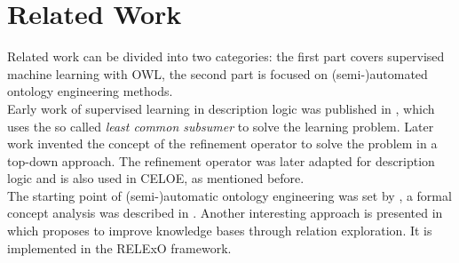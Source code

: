\section{Related Work}
Related work can be divided into two categories: the first part covers
supervised machine learning with OWL, the second part is focused on
(semi-)automated ontology engineering methods.
\\
Early work of supervised learning in description logic was published in
\cite{related_9,related_10}, which uses the so called \emph{least common
subsumer} to solve the learning problem. Later work invented the concept of the
refinement operator to solve the problem in a top-down
approach.\cite{related_7} The refinement operator was later adapted for
description logic \cite{refinement1,refinement2,refinement3} and is also used in
CELOE, as mentioned before.
\\
The starting point of (semi-)automatic ontology engineering was set by
\cite{related_31}, a formal concept analysis was described in \cite{related_5}.
Another interesting approach is presented in \cite{related_relexo} which
proposes to improve knowledge bases through relation exploration. It is
implemented in the RELExO framework.